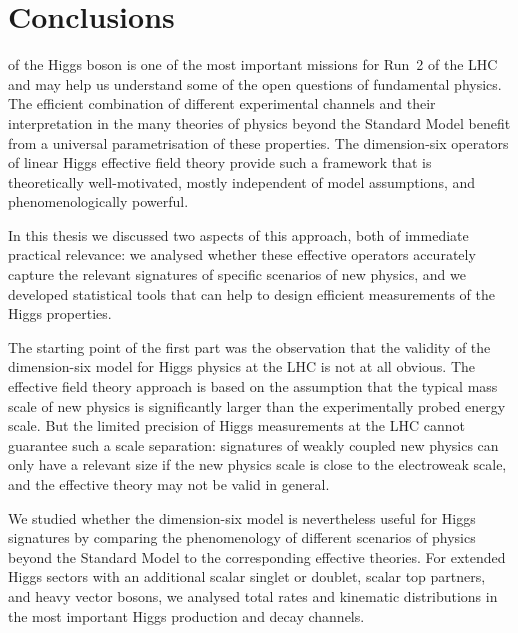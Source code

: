 
 
\chapter{Conclusions}
\label{chapter:conclusions}

 of the Higgs boson is one of
the most important missions for Run~2 of the LHC and may help us
understand some of the open questions of fundamental physics. The
efficient combination of different experimental channels and their
interpretation in the many theories of physics beyond the Standard Model
benefit from a universal parametrisation of these properties. The
dimension-six operators of linear Higgs effective field theory provide
such a framework that is theoretically well-motivated, mostly
independent of model assumptions, and phenomenologically powerful.

In this thesis we discussed two aspects of this approach, both of
immediate practical relevance: we analysed whether these effective
operators accurately capture the relevant signatures of specific
scenarios of new physics, and we developed statistical tools that can
help to design efficient measurements of the Higgs properties.

\newparagraph
%
The starting point of the first part was the observation that the
validity of the dimension-six model for Higgs physics at the LHC is
not at all obvious. The effective field theory approach is based on
the assumption that the typical mass scale of new physics is
significantly larger than the experimentally probed energy scale. But
the limited precision of Higgs measurements at the LHC cannot
guarantee such a scale separation: signatures of weakly coupled new
physics can only have a relevant size if the new physics scale is
close to the electroweak scale, and the effective theory may not be
valid in general.

We studied whether the dimension-six model is nevertheless useful for
Higgs signatures
by comparing the phenomenology of different scenarios of physics
beyond the Standard Model to the corresponding effective theories. For
extended Higgs sectors with an additional scalar singlet or doublet,
scalar top partners, and heavy vector bosons, we analysed total rates
and kinematic distributions in the most important Higgs production and
decay channels.

